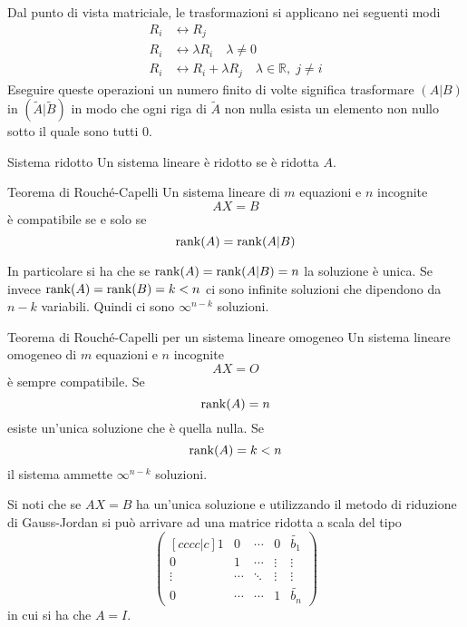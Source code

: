 Dal punto di vista matriciale, le trasformazioni si applicano nei seguenti modi
\begin{align*}
  R_i &\leftrightarrow R_j\\
  R_i &\leftrightarrow \lambda R_i\quad\lambda\neq0\\
  R_i &\leftrightarrow R_i+\lambda R_j\quad\lambda\in\mathbb{R},\;j\neq i
\end{align*}
Eseguire queste operazioni un numero finito di volte significa trasformare $(A\vert B)$
in $(\widetilde{A}\vert\widetilde{B})$ in modo che ogni riga di $\widetilde{A}$ non
nulla esista un elemento non nullo sotto il quale sono tutti $0$.

\begin{Def}{Sistema ridotto}
  Un sistema lineare è ridotto se è ridotta $A$.
\end{Def}

\begin{Thm}{Teorema di Rouché-Capelli}\label{thm:lineare_rouche-capelli}
  Un sistema lineare di $m$ equazioni e $n$ incognite
  \begin{equation*}
    AX = B
  \end{equation*}
  è compatibile se e solo se
  \begin{equation*}
    \rank(A) = \rank(A\vert B)
  \end{equation*}
\end{Thm}

In particolare si ha che se $\rank(A)=\rank(A\vert B)=n$ la soluzione è unica. Se invece
$\rank(A)=\rank(B)=k<n$ ci sono infinite soluzioni che dipendono da $n-k$ variabili.
Quindi ci sono $\infty^{n-k}$ soluzioni.

\begin{SubThm}{Teorema di Rouché-Capelli per un sistema lineare omogeneo}
  Un sistema lineare omogeneo di $m$ equazioni e $n$ incognite
  \begin{equation*}
    AX = O
  \end{equation*}
  è sempre compatibile. Se
  \begin{equation*}
    \rank(A) = n
  \end{equation*}
  esiste un'unica soluzione che è quella nulla. Se
  \begin{equation*}
    \rank(A) = k < n
  \end{equation*}
  il sistema ammette $\infty^{n-k}$ soluzioni.
\end{SubThm}

Si noti che se $AX=B$ ha un'unica soluzione e utilizzando il metodo di riduzione di
Gauss-Jordan si può arrivare ad una matrice ridotta a scala del tipo
\begin{equation*}
  \begin{pmatrix}[cccc|c]
    1 & 0 & \cdots & 0 & \widetilde{b_1}\\
    0 & 1 & \cdots & \vdots & \vdots\\
    \vdots & \cdots & \ddots & \vdots & \vdots\\
    0 & \cdots & \cdots & 1 & \widetilde{b_n}
  \end{pmatrix}
\end{equation*}
in cui si ha che $A=I$.


